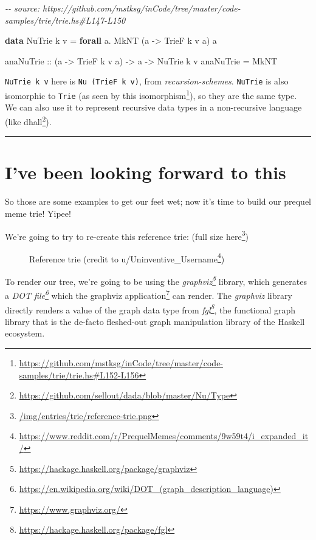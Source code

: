 \documentclass[]{article}
\newenvironment{Shaded}{}{}
\newcommand{\CommentTok}[1]{\textcolor[rgb]{0.38,0.63,0.69}{\textit{#1}}}
\newcommand{\DataTypeTok}[1]{\textcolor[rgb]{0.56,0.13,0.00}{#1}}
\newcommand{\KeywordTok}[1]{\textcolor[rgb]{0.00,0.44,0.13}{\textbf{#1}}}
\newcommand{\NormalTok}[1]{#1}
\newcommand{\OperatorTok}[1]{\textcolor[rgb]{0.40,0.40,0.40}{#1}}
\newcommand{\OtherTok}[1]{\textcolor[rgb]{0.00,0.44,0.13}{#1}}
\renewcommand{\href}[2]{#2\footnote{\url{#1}}}
\begin{document}
\begin{Shaded}
\begin{Highlighting}[]
\CommentTok{{-}{-} source: https://github.com/mstksg/inCode/tree/master/code{-}samples/trie/trie.hs\#L147{-}L150}

\KeywordTok{data} \DataTypeTok{NuTrie}\NormalTok{ k v }\OtherTok{=} \KeywordTok{forall}\NormalTok{ a}\OperatorTok{.} \DataTypeTok{MkNT}\NormalTok{ (a }\OtherTok{{-}\textgreater{}} \DataTypeTok{TrieF}\NormalTok{ k v a) a}

\OtherTok{anaNuTrie ::}\NormalTok{ (a }\OtherTok{{-}\textgreater{}} \DataTypeTok{TrieF}\NormalTok{ k v a) }\OtherTok{{-}\textgreater{}}\NormalTok{ a }\OtherTok{{-}\textgreater{}} \DataTypeTok{NuTrie}\NormalTok{ k v }
\NormalTok{anaNuTrie }\OtherTok{=} \DataTypeTok{MkNT}
\end{Highlighting}
\end{Shaded}

\texttt{NuTrie\ k\ v} here is \texttt{Nu\ (TrieF\ k\ v)}, from
\emph{recursion-schemes}. \texttt{NuTrie} is also isomorphic to \texttt{Trie}
(as seen by
\href{https://github.com/mstksg/inCode/tree/master/code-samples/trie/trie.hs\#L152-L156}{this
isomorphism}), so they are the same type. We can also use it to represent
recursive data types in a non-recursive language (like
\href{https://github.com/sellout/dada/blob/master/Nu/Type}{dhall}).

\begin{center}\rule{0.5\linewidth}{0.5pt}\end{center}

\section{I've been looking forward to
this}\label{ive-been-looking-forward-to-this}

So those are some examples to get our feet wet; now it's time to build our
prequel meme trie! Yipee!

We're going to try to re-create this reference trie:
(\href{/img/entries/trie/reference-trie.png}{full size here})

\begin{figure}
\centering
{}
\caption{Reference trie (credit to
\href{https://www.reddit.com/r/PrequelMemes/comments/9w59t4/i_expanded_it/}{u/Uninventive\_Username})}
\end{figure}

To render our tree, we're going to be using the
\emph{\href{https://hackage.haskell.org/package/graphviz}{graphviz}} library,
which generates a
\emph{\href{https://en.wikipedia.org/wiki/DOT_(graph_description_language)}{DOT
file}} which the \href{https://www.graphviz.org/}{graphviz application} can
render. The \emph{graphviz} library directly renders a value of the graph data
type from \emph{\href{https://hackage.haskell.org/package/fgl}{fgl}}, the
functional graph library that is the de-facto fleshed-out graph manipulation
library of the Haskell ecosystem.
\end{document}

